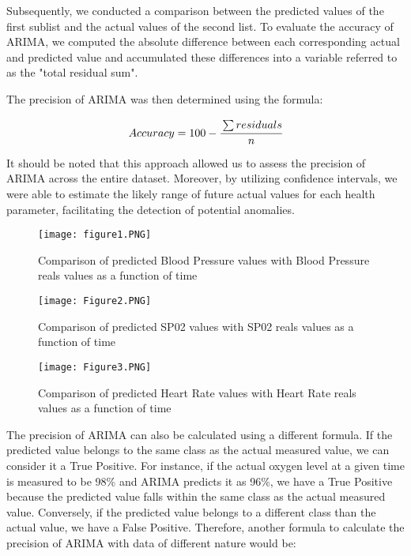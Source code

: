 \documentclass[conference]{IEEEtran}
\begin{document}
Subsequently, we conducted a comparison between the predicted values of the first sublist and the actual values of the second list. To evaluate the accuracy of ARIMA, we computed the absolute difference between each corresponding actual and predicted value and accumulated these differences into a variable referred to as the "total residual sum".

The precision of ARIMA was then determined using the formula:


\[
Accuracy = 100-\cfrac{\sum{residuals}}{n}
\]




It should be noted that this approach allowed us to assess the precision of ARIMA across the entire dataset. 
Moreover, by utilizing confidence intervals, we were able to estimate the likely range of future actual values for each health parameter, facilitating the detection of potential anomalies.


\begin{figure}
    \centering
    \texttt{[image: figure1.PNG]}
    \caption{Comparison of predicted Blood Pressure values with Blood Pressure reals values as a function of time}
    \label{fig:my_label}
\end{figure}

\begin{figure}
    \centering
    \texttt{[image: Figure2.PNG]}
    \caption{Comparison of predicted SP02 values with SP02 reals values as a function of time}
    \label{fig:my_label}
\end{figure}

\begin{figure}
    \centering
    \texttt{[image: Figure3.PNG]}
    \caption{Comparison of predicted Heart Rate values with Heart Rate reals values as a function of time}
    \label{fig:my_label}
\end{figure}


The precision of ARIMA can also be calculated using a different formula. If the predicted value belongs to the same class as the actual measured value, we can consider it a True Positive. For instance, if the actual oxygen level at a given time is measured to be 98\% and ARIMA predicts it as 96\%, we have a True Positive because the predicted value falls within the same class as the actual measured value.
Conversely, if the predicted value belongs to a different class than the actual value, we have a False Positive.
Therefore, another formula to calculate the precision of ARIMA with data of different nature would be:
\end{document}
